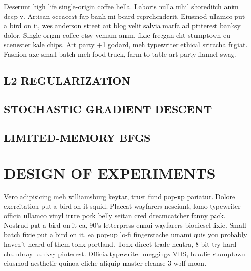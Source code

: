 Deserunt high life single-origin coffee hella. Laboris nulla nihil shoreditch anim deep v. Artisan occaecat fap banh mi beard reprehenderit. Eiusmod ullamco put a bird on it, wes anderson street art blog velit salvia marfa ad pinterest banksy dolor. Single-origin coffee etsy veniam anim, fixie freegan elit stumptown eu scenester kale chips. Art party +1 godard, meh typewriter ethical sriracha fugiat. Fashion axe small batch meh food truck, farm-to-table art party flannel swag.


\subsection{L2 REGULARIZATION}


\subsection{STOCHASTIC GRADIENT DESCENT}


\subsection{LIMITED-MEMORY BFGS}



\section{DESIGN OF EXPERIMENTS}
\label{sec:experiments}

Vero adipisicing meh williamsburg keytar, trust fund pop-up pariatur. Dolore exercitation put a bird on it squid. Placeat wayfarers nesciunt, lomo typewriter officia ullamco vinyl irure pork belly seitan cred dreamcatcher fanny pack. Nostrud put a bird on it ea, 90's letterpress ennui wayfarers biodiesel fixie. Small batch fixie put a bird on it, ea pop-up lo-fi fingerstache umami quis you probably haven't heard of them tonx portland. Tonx direct trade neutra, 8-bit try-hard chambray banksy pinterest. Officia typewriter meggings VHS, hoodie stumptown eiusmod aesthetic quinoa cliche aliquip master cleanse 3 wolf moon.



